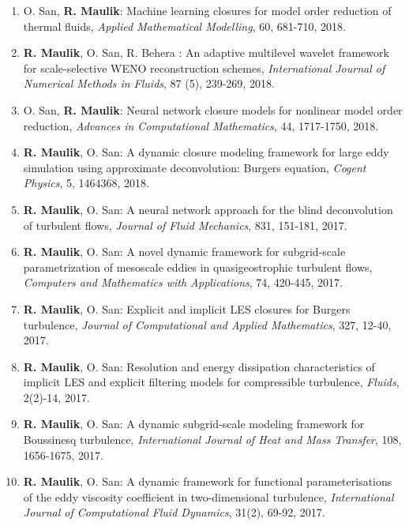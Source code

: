 \documentclass[letterpaper]{article}
\begin{document}
\begin{enumerate}
\item O. San, \textbf{R. Maulik}: Machine learning closures for model order reduction of thermal fluids,  {\it Applied Mathematical Modelling}, 60, 681-710, 2018. 

\item \textbf{R. Maulik}, O. San, R. Behera : An adaptive multilevel wavelet framework for scale-selective WENO reconstruction schemes, {\it International Journal of Numerical Methods in Fluids}, 87 (5), 239-269, 2018. 

\item O. San, \textbf{R. Maulik}: Neural network closure models for nonlinear model order reduction, {\it Advances in Computational Mathematics}, 44, 1717-1750, 2018. 

\item \textbf{R. Maulik}, O. San: A dynamic closure modeling framework for large eddy simulation using approximate deconvolution: Burgers equation, {\it Cogent Physics}, 5, 1464368, 2018. 

\item \textbf{R. Maulik}, O. San: A neural network approach for the blind deconvolution of turbulent flows, {\it Journal of Fluid Mechanics}, 831, 151-181, 2017. 

\item \textbf{R. Maulik}, O. San: A novel dynamic framework for subgrid-scale parametrization of mesoscale eddies in quasigeostrophic turbulent flows, {\it Computers and Mathematics with Applications}, 74, 420-445, 2017. 

\item \textbf{R. Maulik}, O. San: Explicit and implicit LES closures for Burgers turbulence, {\it Journal of Computational and Applied Mathematics}, 327, 12-40, 2017. 

\item \textbf{R. Maulik}, O. San: Resolution and energy dissipation characteristics of implicit LES and explicit filtering models for compressible turbulence, {\it Fluids}, 2(2)-14, 2017. 

\item \textbf{R. Maulik}, O. San: A dynamic subgrid-scale modeling framework for Boussinesq turbulence, {\it International Journal of Heat and Mass Transfer}, 108, 1656-1675, 2017. 

\item \textbf{R. Maulik}, O. San: A dynamic framework for functional parameterisations of the eddy viscosity coefficient in two-dimensional turbulence, {\it International Journal of Computational Fluid Dynamics}, 31(2), 69-92, 2017. 


\end{enumerate}
\end{document}
